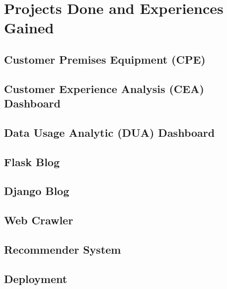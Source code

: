 \chapter{Projects Done and Experiences Gained}
\section{Customer Premises Equipment (CPE)}
\section{Customer Experience Analysis (CEA) Dashboard}
\section{Data Usage Analytic (DUA) Dashboard}
\section{Flask Blog}
\section{Django Blog}
\section{Web Crawler}
\section{Recommender System}
\section{Deployment}
